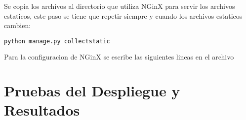 Se copia los archivos al directorio que utiliza NGinX para servir los archivos estaticos, este paso se tiene que repetir siempre y cuando los archivos estaticos cambien:
\begin{lstlisting}
python manage.py collectstatic
\end{lstlisting}

Para la configuracion de NGinX se escribe las siguientes lineas en el archivo \\ \texttt{}

\section{Pruebas del Despliegue y Resultados}
